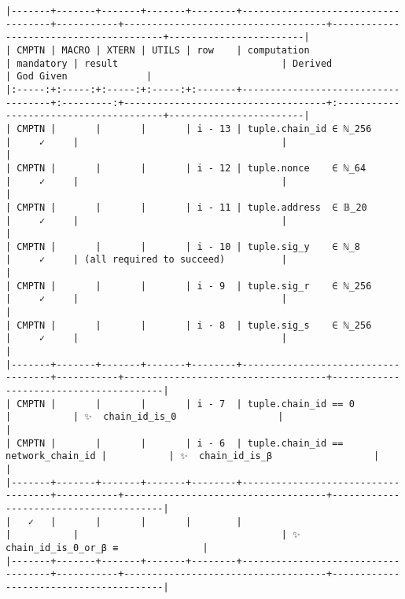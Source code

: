 \documentclass[varwidth=\maxdimen,margin=0.5cm,multi={verbatim}]{standalone}
\begin{document}
\begin{verbatim}
|-------+-------+-------+-------+--------+------------------------------------+-----------+------------------------------------+----------------------------------------+------------------------|
| CMPTN | MACRO | XTERN | UTILS | row    | computation                        | mandatory | result                             | Derived                                | God Given              |
|:-----:+:-----:+:-----:+:-----:+:-------+------------------------------------+:---------:+------------------------------------+:---------------------------------------+------------------------|
| CMPTN |       |       |       | i - 13 | tuple.chain_id ∈ ℕ_256             |     ✓     |                                    |                                        |
| CMPTN |       |       |       | i - 12 | tuple.nonce    ∈ ℕ_64              |     ✓     |                                    |                                        |
| CMPTN |       |       |       | i - 11 | tuple.address  ∈ 𝔹_20              |     ✓     |                                    |                                        |
| CMPTN |       |       |       | i - 10 | tuple.sig_y    ∈ ℕ_8               |     ✓     | (all required to succeed)          |                                        |
| CMPTN |       |       |       | i - 9  | tuple.sig_r    ∈ ℕ_256             |     ✓     |                                    |                                        |
| CMPTN |       |       |       | i - 8  | tuple.sig_s    ∈ ℕ_256             |     ✓     |                                    |                                        |
|-------+-------+-------+-------+--------+------------------------------------+-----------+------------------------------------+----------------------------------------|
| CMPTN |       |       |       | i - 7  | tuple.chain_id == 0                |           | ✨  chain_id_is_0                  |                                        |
| CMPTN |       |       |       | i - 6  | tuple.chain_id == network_chain_id |           | ✨  chain_id_is_β                  |                                        |
|-------+-------+-------+-------+--------+------------------------------------+-----------+------------------------------------+----------------------------------------|
|   ✓   |       |       |       |        |                                    |           |                                    | ✨  chain_id_is_0_or_β ≡               |
|-------+-------+-------+-------+--------+------------------------------------+-----------+------------------------------------+----------------------------------------|

\end{verbatim}
\end{document}
